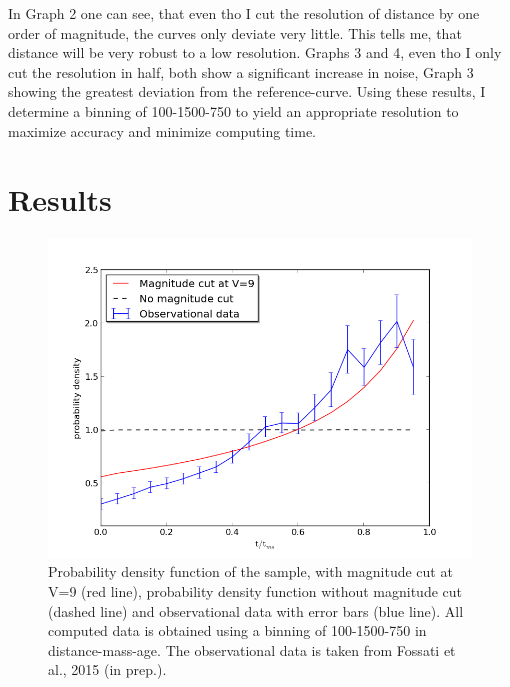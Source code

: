 \documentclass[a4paper,10pt]{article}
\begin{document}
 In Graph 2 one can see, that even tho I cut the resolution of distance by one order of magnitude, the curves only deviate very little. This
 tells me, that distance will be very robust to a low resolution. Graphs 3 and 4, even tho I only cut the resolution in half, both 
 show a significant increase in noise, Graph 3 showing the greatest deviation from the reference-curve. Using these results, I determine 
 a binning of 100-1500-750 to yield an appropriate resolution to maximize accuracy and minimize computing time.
 
 \newpage
 \section{Results}
 \begin{figure}[h!]
   \includegraphics[width=\textwidth]{plot1}
   \caption{Probability density function of the sample, with magnitude cut at V=9 (red line), probability 
   density function without magnitude cut
   (dashed line) and observational data with error bars (blue line). All computed data is obtained using a binning of 100-1500-750
   in distance-mass-age. The observational data is taken from Fossati et al., 2015 (in prep.).\label{all3}}
 \end{figure}
 
\end{document}
